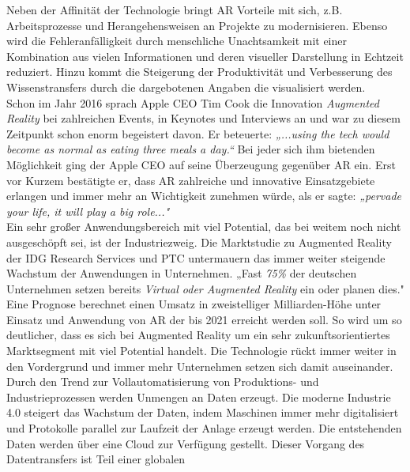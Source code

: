 Neben der Affinität der Technologie bringt \acs{AR} Vorteile mit sich, z.B. Arbeitsprozesse und Herangehensweisen an Projekte zu 
modernisieren. Ebenso wird die Fehleranfälligkeit durch menschliche Unachtsamkeit mit einer Kombination aus vielen Informationen und 
deren visueller Darstellung in Echtzeit reduziert. Hinzu kommt die Steigerung der Produktivität und Verbesserung des Wissenstransfers 
durch die dargebotenen Angaben die visualisiert werden.
\\ 
\linebreak
Schon im Jahr 2016 sprach Apple CEO Tim Cook die Innovation \textit{Augmented Reality} bei zahlreichen Events, in Keynotes und Interviews 
an und war zu diesem Zeitpunkt schon enorm begeistert davon. Er beteuerte: \textit{„...using the tech would become as normal as eating three 
meals a day.“} \cite{timcook2016.2016o} Bei jeder sich ihm bietenden Möglichkeit ging der Apple CEO auf seine Überzeugung gegenüber \acl{AR} ein. 
Erst vor Kurzem bestätigte er, dass \acs{AR} zahlreiche und innovative Einsatzgebiete erlangen und immer mehr an Wichtigkeit zunehmen 
würde, als er sagte: \textit{„pervade your life, it will play a big role..."} \cite{timcook.2020j} 
\\ 
\linebreak
Ein sehr großer Anwendungsbereich mit viel Potential, das bei weitem noch nicht ausgeschöpft sei, ist der Industriezweig. Die 
Marktstudie zu Augmented Reality der IDG Research Services und PTC untermauern das immer weiter steigende Wachstum der Anwendungen in 
Unternehmen. „Fast \textit{75\%} der deutschen Unternehmen setzen bereits \textit{Virtual oder Augmented Reality} ein oder planen dies." 
\cite{studieptc.2020j} Eine Prognose berechnet einen Umsatz in zweistelliger Milliarden-Höhe unter Einsatz und Anwendung von \acs{AR} der 
bis 2021 erreicht werden soll. So wird um so deutlicher, dass es sich bei Augmented Reality um ein sehr zukunftsorientiertes Marktsegment 
mit viel Potential handelt. Die Technologie rückt immer weiter in den Vordergrund und immer mehr Unternehmen setzen sich damit auseinander.
\\ 
\linebreak
Durch den Trend zur Vollautomatisierung von Produktions- und Industrieprozessen werden Unmengen an Daten erzeugt. Die moderne Industrie 4.0 
steigert das Wachstum der Daten, indem Maschinen immer mehr digitalisiert und Protokolle parallel zur Laufzeit der Anlage erzeugt werden. 
Die entstehenden Daten werden über eine Cloud zur Verfügung gestellt. Dieser Vorgang des Datentransfers ist Teil einer globalen 

